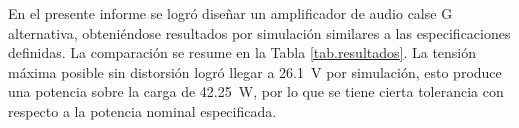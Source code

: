 




	En el presente informe se logró diseñar un amplificador de audio calse G alternativa, obteniéndose resultados por simulación similares a las especificaciones definidas. La comparación se resume en la Tabla \ref{tab.resultados}. La tensión máxima posible sin distorsión logró llegar a \SI{26.1}{\volt} por simulación, esto produce una potencia sobre la carga de \SI{42.25}{\watt}, por lo que se tiene cierta tolerancia con respecto a la potencia nominal especificada.



